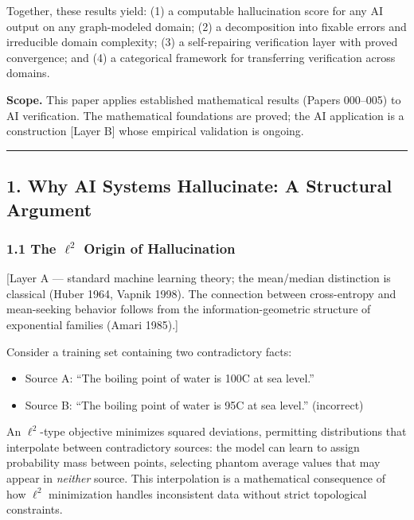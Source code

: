 \documentclass[
]{article}
\providecommand{\tightlist}{%
  \setlength{\itemsep}{0pt}\setlength{\parskip}{0pt}}
\begin{document}
Together, these results yield: (1) a computable hallucination score for
any AI output on any graph-modeled domain; (2) a decomposition into
fixable errors and irreducible domain complexity; (3) a self-repairing
verification layer with proved convergence; and (4) a categorical
framework for transferring verification across domains.

\textbf{Scope.} This paper applies established mathematical results
(Papers 000--005) to AI verification. The mathematical foundations are
proved; the AI application is a construction {[}Layer B{]} whose
empirical validation is ongoing.

\begin{center}\rule{0.5\linewidth}{0.5pt}\end{center}

\subsection{1. Why AI Systems Hallucinate: A Structural
Argument}\label{why-ai-systems-hallucinate-a-structural-argument}

\subsubsection{\texorpdfstring{1.1 The \(\ell^2\) Origin of
Hallucination}{1.1 The \textbackslash ell\^{}2 Origin of Hallucination}}\label{the-ell2-origin-of-hallucination}

{[}Layer A --- standard machine learning theory; the mean/median
distinction is classical (Huber 1964, Vapnik 1998). The connection
between cross-entropy and mean-seeking behavior follows from the
information-geometric structure of exponential families (Amari 1985).{]}

Consider a training set containing two contradictory facts:

\begin{itemize}
\tightlist
\item
  Source A: ``The boiling point of water is 100C at sea level.''
\item
  Source B: ``The boiling point of water is 95C at sea level.''
  (incorrect)
\end{itemize}

An \(\ell^2\)-type objective minimizes squared deviations, permitting
distributions that interpolate between contradictory sources: the model
can learn to assign probability mass between points, selecting phantom
average values that may appear in \emph{neither} source. This
interpolation is a mathematical consequence of how \(\ell^2\)
minimization handles inconsistent data without strict topological
constraints.
\end{document}
